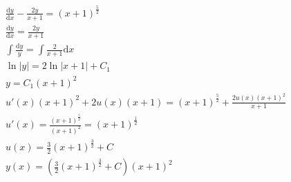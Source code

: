 \documentclass{article}
\newcommand\di[1]{\text{d}#1}74
\begin{document}
  \begin{gather*}
    
  \end{gather*}
  \begin{gather*}
    \frac{\di{y}}{\di{x}} - \frac{2y}{x + 1} = ( x + 1 )^{\frac{5}{2}} \\
    \frac{\di{y}}{\di{x}} = \frac{2y}{x + 1} \\
    \int\frac{\di{y}}{y} = \int\frac{2}{x + 1}\di{x} \\
    \ln{\left\lvert y\right\rvert} = 2\ln{\left\lvert x + 1\right\rvert} + C_1 \\
    y = C_1(x+1)^2 \\
    u'(x)(x+1)^2 + 2u(x)(x+1) = (x + 1)^{\frac{5}{2}} + \frac{2u(x)(x+1)^2}{x+1} \\
    u'(x) = \frac{(x+1)^{\frac{5}{2}}}{(x+1)^2} = (x+1)^{\frac{1}{2}} \\
    u(x) = \frac{3}{2}(x+1)^{\frac{3}{2}} + C \\
    y(x) = (\frac{3}{2}(x+1)^{\frac{3}{2}} + C)(x+1)^2
  \end{gather*}
\end{document}
